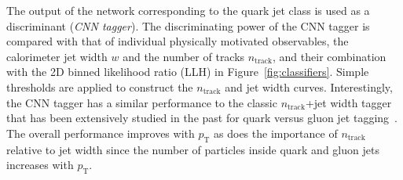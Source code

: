 The output of the network corresponding to the quark jet class is used as a discriminant (\textit{CNN tagger}).
The discriminating power of the CNN tagger is compared with that of individual physically motivated observables, the calorimeter jet width $w$ and the number of tracks $n_\text{track}$, and their combination with the 2D binned likelihood ratio (LLH) in Figure~\ref{fig:classifiers}.  Simple thresholds are applied to construct the $n_\text{track}$ and jet width curves.  Interestingly, the CNN tagger has a similar performance to the classic $n_\text{track}$+jet width tagger that has been extensively studied in the past for quark versus gluon jet tagging~\cite{Aad:2014gea,ATLAS-CONF-2016-034}.  
The overall performance improves with $p_\text{T}$ as does the importance of $n_\text{track}$ relative to jet width since the number of particles inside quark and gluon jets increases with $p_\text{T}$.

